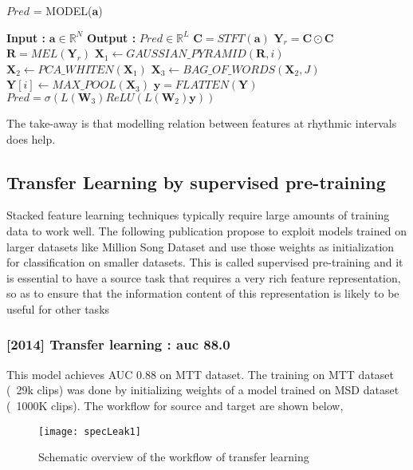 \begin{algorithm}
  \caption{$Pred$ = MODEL($\textbf{a}$) }\label{Temporal Pooling}
  \begin{algorithmic}[1]
    \Statex \textbf{Input :} $\textbf{a} \in \mathbb{R}^{N}$
    \Statex \textbf{Output :} $Pred \in \mathbb{R}^{L}$ 
    \State $\textbf{C} = STFT(\textbf{a})$ 
    \State $\textbf{Y}_{r} = \textbf{C} \odot \textbf{C}$ 
    \State $\textbf{R} = MEL(\textbf{Y}_{r})$ 
     \State $\textbf{X}_{1} \leftarrow GAUSSIAN\_PYRAMID(\textbf{R},i)$ 
    \State $\textbf{X}_{2} \leftarrow PCA\_WHITEN(\textbf{X}_{1})$ 
     \State $\textbf{X}_{3} \leftarrow BAG\_OF\_WORDS(\textbf{X}_{2},J)$ 
    \State $\textbf{Y}[i] \leftarrow MAX\_POOL(\textbf{X}_{3})$ 
    \EndFor
    \State $\textbf{y} = FLATTEN(\textbf{Y})$ 
    \State $Pred = \sigma(L(\textbf{W}_{3})ReLU(L(\textbf{W}_{2})\textbf{y}))$ 
  \end{algorithmic}
\end{algorithm}
\noindent The take-away is that modelling relation between features at rhythmic intervals does help.

\subsection{Transfer Learning by supervised pre-training}
Stacked feature learning techniques  typically require large amounts of training data to work well. The following publication propose to exploit models trained on larger datasets like Million Song Dataset and use those weights as initialization for classification on smaller datasets. This is called supervised pre-training and it is essential to have a source task that requires a very rich feature representation, so as to ensure that the information content of this representation is likely to be useful for other tasks

\subsubsection{[2014] Transfer learning : auc 88.0}
This model achieves AUC 0.88 on MTT dataset. The training on MTT dataset (~29k clips) was done by initializing weights of a model trained on MSD dataset (~1000K clips). The workflow for source and target are shown below,
\begin{figure}[h] 
\centering
\texttt{[image: specLeak1]}
\caption{Schematic overview of the workflow of transfer learning}
 \label{fig:transfer learning}
 \end{figure}
\FloatBarrier
\bigskip


